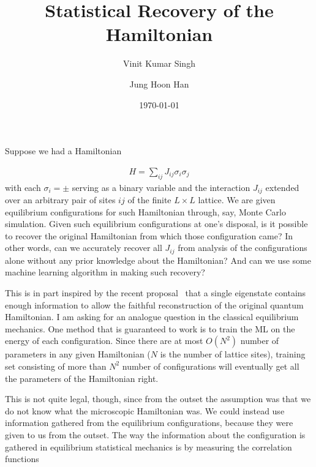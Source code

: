 \documentclass[reprint,amsmath,amssymb,aps,showpacs,superscriptaddress,prb]{revtex4-1}
\newcommand{\ba}{\begin{eqnarray}}
\newcommand{\ea}{\end{eqnarray}}
\begin{document}
%
\title{Statistical Recovery of the Hamiltonian}

\author{Vinit Kumar Singh}
\author{Jung Hoon Han}
\date{\today}

\begin{abstract}
\end{abstract}
\maketitle



Suppose we had a Hamiltonian

\ba H = \sum_{ij} J_{ij} \sigma_i \sigma_j \ea
with each $\sigma_i = \pm$ serving as a binary variable and the interaction $J_{ij}$ extended over an arbitrary pair of sites $ij$ of the finite $L\times L$ lattice. We are  given equilibrium configurations for such Hamiltonian through, say, Monte Carlo simulation. Given such equilibrium configurations at one's disposal, is it possible to recover the original Hamiltonian from which those configuration came? In other words, can we accurately recover all $J_{ij}$ from analysis of the configurations alone without any prior knowledge about the Hamiltonian? And can we use some machine learning algorithm in making such recovery?

This is in part inspired by the recent proposal~\cite{qi18} that a single eigenstate contains enough information to allow the faithful reconstruction of the original quantum Hamiltonian. I am asking for an analogue question in the classical equilibrium mechanics. One method that is guaranteed to work is to train the ML on the energy of each configuration. Since there are at most $O(N^2)$ number of parameters in any given Hamiltonian ($N$ is the number of lattice sites), training set consisting of more than $N^2$ number of configurations will eventually get all the parameters of the Hamiltonian right.

This is not quite legal, though, since from the outset the assumption was that we do not know what the microscopic Hamiltonian was. We could instead use information gathered from the equilibrium configurations, because they were given to us from the outset. The way the information about the configuration is gathered in equilibrium statistical mechanics is by measuring the correlation functions
\end{document}
